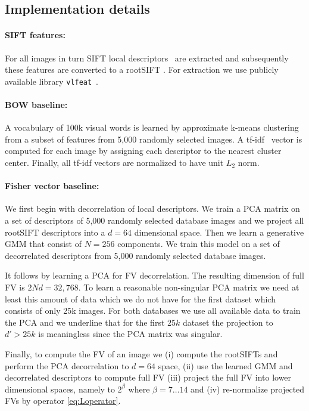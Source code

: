 \documentclass[table]{article} %
\begin{document}
   \subsection{Implementation details}
	   	\paragraph{SIFT features:}
	   		For all images in turn SIFT local descriptors~\cite{Lowe04} are extracted and subsequently these features are converted to a rootSIFT \cite{Arandjelovic12}. For extraction we use publicly available library {\tt vlfeat}~\cite{vlfeat}.
	    
	    \vspace{-4mm}
	   	\paragraph{BOW baseline:}	
	    	A vocabulary of 100k visual words is learned by approximate k-means clustering~\cite{Philbin07} from a subset of features from 5,000 randomly selected images. A tf-idf~\cite{Sivic2003} vector is computed for each image by assigning each descriptor to the nearest cluster center.  Finally, all tf-idf vectors are normalized to have unit $L_2$ norm.

	    \vspace{-4mm}
	    \paragraph{Fisher vector baseline:}
	    	We first begin with decorrelation of local descriptors. We train a PCA matrix on a set of descriptors of 5,000 randomly selected database images and we project all rootSIFT descriptors into a $d=64$ dimensional space. Then we learn a generative GMM that consist of $N=256$ components. We train this model on a set of decorrelated descriptors from 5,000 randomly selected database images.

	    	It follows by learning a PCA for FV decorrelation. The resulting dimension of full FV is $2Nd=32,768$. To learn a reasonable non-singular PCA matrix we need at least this amount of data which we do not have for the first dataset which consists of only 25k images. For both databases we use all available data to train the PCA and we underline that for the first $25k$ dataset the projection to $d'>25k$ is meaningless since the PCA matrix was singular.

	    	Finally, to compute the FV of an image we (i) compute the rootSIFTs and perform the PCA decorrelation to $d=64$ space, (ii) use the learned GMM and decorrelated descriptors to compute full FV (iii) project the full FV into lower dimensional spaces, namely to $2^\beta$ where $\beta=7\dots 14$ and (iv) re-normalize projected FVs by operator \eqref{eq:Loperator}.
\end{document}
